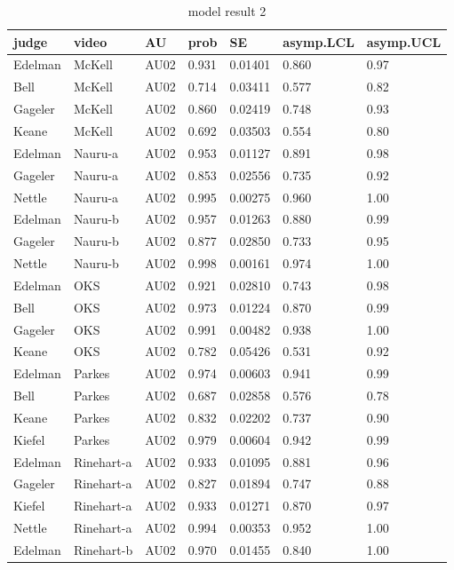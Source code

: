 \documentclass{monashthesis}
\begin{document}
\begin{center}
\begin{longtable}{lllllll}
\caption{\label{tab:result_2} model result 2}\\
\toprule
judge & video & AU & prob & SE & asymp.LCL & asymp.UCL \\
\midrule
\endhead
\bottomrule
\endfoot
Edelman & McKell & AU02 & 0.931 & 0.01401 & 0.860 & 0.97 \\
Bell & McKell & AU02 & 0.714 & 0.03411 & 0.577 & 0.82 \\
Gageler & McKell & AU02 & 0.860 & 0.02419 & 0.748 & 0.93 \\
Keane & McKell & AU02 & 0.692 & 0.03503 & 0.554 & 0.80 \\
Edelman & Nauru-a & AU02 & 0.953 & 0.01127 & 0.891 & 0.98 \\
Gageler & Nauru-a & AU02 & 0.853 & 0.02556 & 0.735 & 0.92 \\
Nettle & Nauru-a & AU02 & 0.995 & 0.00275 & 0.960 & 1.00 \\
Edelman & Nauru-b & AU02 & 0.957 & 0.01263 & 0.880 & 0.99 \\
Gageler & Nauru-b & AU02 & 0.877 & 0.02850 & 0.733 & 0.95 \\
Nettle & Nauru-b & AU02 & 0.998 & 0.00161 & 0.974 & 1.00 \\
Edelman & OKS & AU02 & 0.921 & 0.02810 & 0.743 & 0.98 \\
Bell & OKS & AU02 & 0.973 & 0.01224 & 0.870 & 0.99 \\
Gageler & OKS & AU02 & 0.991 & 0.00482 & 0.938 & 1.00 \\
Keane & OKS & AU02 & 0.782 & 0.05426 & 0.531 & 0.92 \\
Edelman & Parkes & AU02 & 0.974 & 0.00603 & 0.941 & 0.99 \\
Bell & Parkes & AU02 & 0.687 & 0.02858 & 0.576 & 0.78 \\
Keane & Parkes & AU02 & 0.832 & 0.02202 & 0.737 & 0.90 \\
Kiefel & Parkes & AU02 & 0.979 & 0.00604 & 0.942 & 0.99 \\
Edelman & Rinehart-a & AU02 & 0.933 & 0.01095 & 0.881 & 0.96 \\
Gageler & Rinehart-a & AU02 & 0.827 & 0.01894 & 0.747 & 0.88 \\
Kiefel & Rinehart-a & AU02 & 0.933 & 0.01271 & 0.870 & 0.97 \\
Nettle & Rinehart-a & AU02 & 0.994 & 0.00353 & 0.952 & 1.00 \\
Edelman & Rinehart-b & AU02 & 0.970 & 0.01455 & 0.840 & 1.00 \\

\end{longtable}
\end{center}
\end{document}
